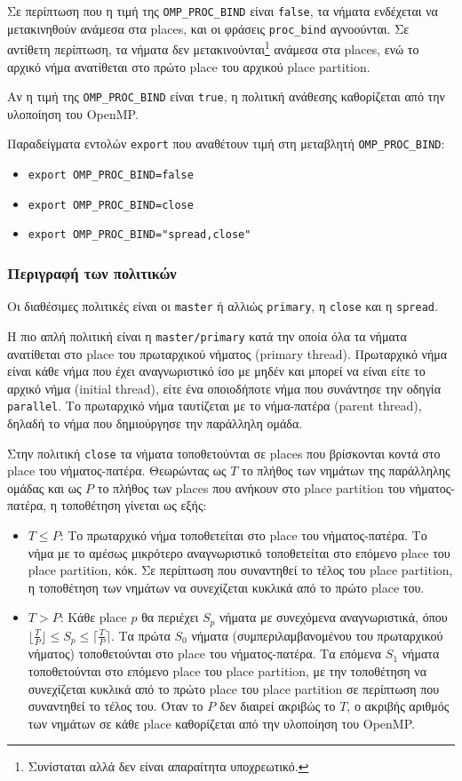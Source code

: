 Σε περίπτωση που η τιμή της \texttt{OMP\_PROC\_BIND} είναι \texttt{false}, τα νήματα ενδέχεται να μετακινηθούν ανάμεσα στα places, και οι φράσεις \texttt{proc\_bind} αγνοούνται. Σε αντίθετη περίπτωση, τα νήματα δεν μετακινούνται\footnote{Συνίσταται αλλά δεν είναι απαραίτητα υποχρεωτικό.} ανάμεσα στα places, ενώ το αρχικό νήμα ανατίθεται στο πρώτο place του αρχικού place partition.

Αν η τιμή της \texttt{OMP\_PROC\_BIND} είναι \texttt{true}, η πολιτική ανάθεσης καθορίζεται από την υλοποίηση του OpenMP.

Παραδείγματα εντολών \texttt{export} που αναθέτουν τιμή στη μεταβλητή \texttt{OMP\_PROC\_BIND}:
\begin{itemize}
	\item \texttt{export OMP\_PROC\_BIND=false}
	\item \texttt{export OMP\_PROC\_BIND=close}
	\item \texttt{export OMP\_PROC\_BIND="spread,close"}
\end{itemize}


\subsubsection{Περιγραφή των πολιτικών}
Οι διαθέσιμες πολιτικές είναι οι \texttt{master} ή αλλιώς \texttt{primary}, η \texttt{close} και η \texttt{spread}.

Η πιο απλή πολιτική είναι η \texttt{master/primary} κατά την οποία όλα τα νήματα ανατίθεται στο place του πρωταρχικού νήματος (primary thread). Πρωταρχικό νήμα είναι κάθε νήμα που έχει αναγνωριστικό ίσο με μηδέν και μπορεί να είναι είτε το αρχικό νήμα (initial thread), είτε ένα οποιοδήποτε νήμα που συνάντησε την οδηγία \texttt{parallel}. Το πρωταρχικό νήμα ταυτίζεται με το νήμα-πατέρα (parent thread), δηλαδή το νήμα που δημιούργησε την παράλληλη ομάδα.

Στην πολιτική \texttt{close} τα νήματα τοποθετούνται σε places που βρίσκονται κοντά στο place του νήματος-πατέρα. Θεωρώντας ως $T$ το πλήθος των νημάτων της παράλληλης ομάδας και ως $P$ το πλήθος των places που ανήκουν στο place partition του νήματος-πατέρα, η τοποθέτηση γίνεται ως εξής:
\begin{itemize}
	\item $T \leq P$: Το πρωταρχικό νήμα τοποθετείται στο place του νήματος-πατέρα. Το νήμα με το αμέσως μικρότερο αναγνωριστικό τοποθετείται στο επόμενο place του place partition, κόκ. Σε περίπτωση που συναντηθεί το τέλος του place partition, η τοποθέτηση των νημάτων να συνεχίζεται κυκλικά από το πρώτο place του.
	\item $T > P$: Κάθε place $p$ θα περιέχει $S_p$ νήματα με συνεχόμενα αναγνωριστικά, όπου $\lfloor \frac{T}{P} \rfloor \leq S_p \leq \lceil \frac{T}{P} \rceil$. Τα πρώτα $S_0$ νήματα (συμπεριλαμβανομένου του πρωταρχικού νήματος) τοποθετούνται στο place του νήματος-πατέρα. Τα επόμενα $S_1$ νήματα τοποθετούνται στο επόμενο place του place partition, με την τοποθέτηση να συνεχίζεται κυκλικά από το πρώτο place του place partition σε περίπτωση που συναντηθεί το τέλος του. Όταν το $P$ δεν διαιρεί ακριβώς το $T$, ο ακριβής αριθμός των νημάτων σε κάθε place καθορίζεται από την υλοποίηση του OpenMP.
\end{itemize}

